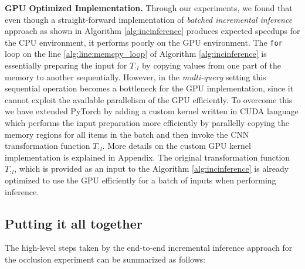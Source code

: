 \vspace{2mm}
\noindent \textbf{GPU Optimized Implementation.}
Through our experiments, we found that even though a straight-forward implementation of \textit{batched incremental inference} approach as shown in Algorithm \ref{alg:incinference} produces expected speedups for the CPU environment, it performs poorly on the GPU environment.
The \texttt{for} loop on the line \ref{alg:line:memcpy_loop} of Algorithm \ref{alg:incinference} is essentially preparing the input for $T_{:l}$ by copying values from one part of the memory to another sequentially.
However, in the \textit{multi-query} setting this sequential operation becomes a bottleneck for the GPU implementation, since it cannot exploit the available parallelism of the GPU efficiently.
To overcome this we have extended PyTorch by adding a custom kernel written in CUDA language which performs the input preparation more efficiently by parallelly copying the memory regions for all items in the batch and then invoke the CNN transformation function $T_{:l}$.
More details on the custom GPU kernel implementation is explained in Appendix.
The original transformation function $T_{:l}$, which is provided as an input to the Algorithm \ref{alg:incinference} is already optimized to use the GPU efficiently for a batch of inputs when performing inference.


\subsection{Putting it all together}

The high-level steps taken by the end-to-end incremental inference approach for the occlusion experiment can be summarized as follows:


